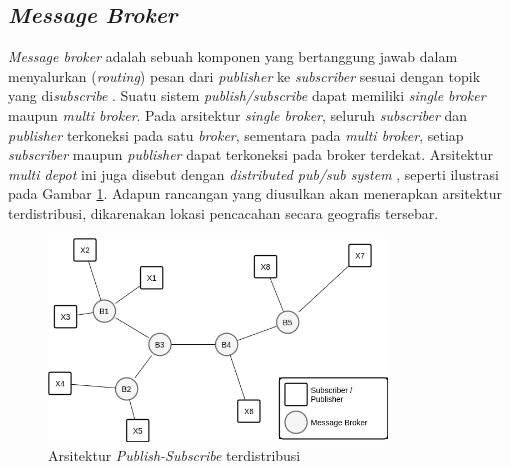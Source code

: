 \subsection{\textit{Message Broker}}
\label{ssec:message-broker}
\textit{Message broker} adalah sebuah komponen yang bertanggung jawab dalam menyalurkan (\textit{routing}) pesan dari \textit{publisher} ke \textit{subscriber} sesuai dengan topik yang di\textit{subscribe} \citep{banavar_efficient_1999}. Suatu sistem \textit{publish/subscribe} dapat memiliki \textit{single broker} maupun \textit{multi broker}. Pada arsitektur \textit{single broker}, seluruh \textit{subscriber} dan \textit{publisher} terkoneksi pada satu \textit{broker}, sementara pada \textit{multi broker}, setiap \textit{subscriber} maupun \textit{publisher} dapat terkoneksi pada broker terdekat. Arsitektur \textit{multi depot} ini juga disebut dengan \textit{distributed pub/sub system} \citep{muhl_large-scale_2002}, seperti ilustrasi pada Gambar \ref{fig:pub_sub_distributed_ilustration}. Adapun rancangan yang diusulkan akan menerapkan arsitektur terdistribusi, dikarenakan lokasi pencacahan secara geografis tersebar.


\begin{figure}[!]
	\centering
	\includegraphics[width=9cm]{Resources/Images/pub_sub_distributed_ilustration}
	\caption{Arsitektur \textit{Publish-Subscribe} terdistribusi}
	\label{fig:pub_sub_distributed_ilustration}
\end{figure}


